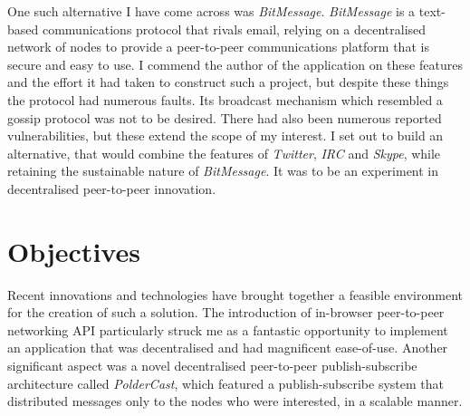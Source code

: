 \documentclass[10pt,a4paper,onecolumn]{article}
\begin{document}
One such alternative I have come across was \emph{BitMessage}. \emph{BitMessage} is a text-based communications protocol that rivals email, relying on a decentralised network of nodes to provide a peer-to-peer communications platform that is secure and easy to use. I commend the author of the application on these features and the effort it had taken to construct such a project, but despite these things the protocol had numerous faults. Its broadcast mechanism which resembled a gossip protocol was not to be desired. There had also been numerous reported vulnerabilities, but these extend the scope of my interest. I set out to build an alternative, that would combine the features of \emph{Twitter}, \emph{IRC} and \emph{Skype}, while retaining the sustainable nature of \emph{BitMessage}. It was to be an experiment in decentralised peer-to-peer innovation.

\section{Objectives}
Recent innovations and technologies have brought together a feasible environment for the creation of such a solution. The introduction of in-browser peer-to-peer networking API particularly struck me as a fantastic opportunity to implement an application that was decentralised and had magnificent ease-of-use. Another significant aspect was a novel decentralised peer-to-peer publish-subscribe architecture called \textit{PolderCast}, which featured a publish-subscribe system that distributed messages only to the nodes who were interested, in a scalable manner.
\end{document}
